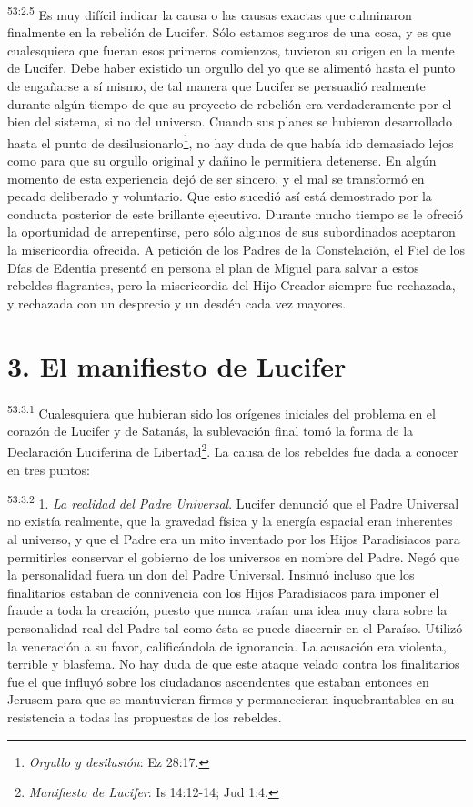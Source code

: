 \par
\textsuperscript{53:2.5} Es muy difícil indicar la causa o las causas exactas que culminaron finalmente en la rebelión de Lucifer. Sólo estamos seguros de una cosa, y es que cualesquiera que fueran esos primeros comienzos, tuvieron su origen en la mente de Lucifer. Debe haber existido un orgullo del yo que se alimentó hasta el punto de engañarse a sí mismo, de tal manera que Lucifer se persuadió realmente durante algún tiempo de que su proyecto de rebelión era verdaderamente por el bien del sistema, si no del universo. Cuando sus planes se hubieron desarrollado hasta el punto de desilusionarlo\footnote{\textit{Orgullo y desilusión}: Ez 28:17.}, no hay duda de que había ido demasiado lejos como para que su orgullo original y dañino le permitiera detenerse. En algún momento de esta experiencia dejó de ser sincero, y el mal se transformó en pecado deliberado y voluntario. Que esto sucedió así está demostrado por la conducta posterior de este brillante ejecutivo. Durante mucho tiempo se le ofreció la oportunidad de arrepentirse, pero sólo algunos de sus subordinados aceptaron la misericordia ofrecida. A petición de los Padres de la Constelación, el Fiel de los Días de Edentia presentó en persona el plan de Miguel para salvar a estos rebeldes flagrantes, pero la misericordia del Hijo Creador siempre fue rechazada, y rechazada con un desprecio y un desdén cada vez mayores.

\section*{3. El manifiesto de Lucifer}
\par
\textsuperscript{53:3.1} Cualesquiera que hubieran sido los orígenes iniciales del problema en el corazón de Lucifer y de Satanás, la sublevación final tomó la forma de la Declaración Luciferina de Libertad\footnote{\textit{Manifiesto de Lucifer}: Is 14:12-14; Jud 1:4.}. La causa de los rebeldes fue dada a conocer en tres puntos:

\par
\textsuperscript{53:3.2} 1. \textit{La realidad del Padre Universal}. Lucifer denunció que el Padre Universal no existía realmente, que la gravedad física y la energía espacial eran inherentes al universo, y que el Padre era un mito inventado por los Hijos Paradisiacos para permitirles conservar el gobierno de los universos en nombre del Padre. Negó que la personalidad fuera un don del Padre Universal. Insinuó incluso que los finalitarios estaban de connivencia con los Hijos Paradisiacos para imponer el fraude a toda la creación, puesto que nunca traían una idea muy clara sobre la personalidad real del Padre tal como ésta se puede discernir en el Paraíso. Utilizó la veneración a su favor, calificándola de ignorancia. La acusación era violenta, terrible y blasfema. No hay duda de que este ataque velado contra los finalitarios fue el que influyó sobre los ciudadanos ascendentes que estaban entonces en Jerusem para que se mantuvieran firmes y permanecieran inquebrantables en su resistencia a todas las propuestas de los rebeldes.

